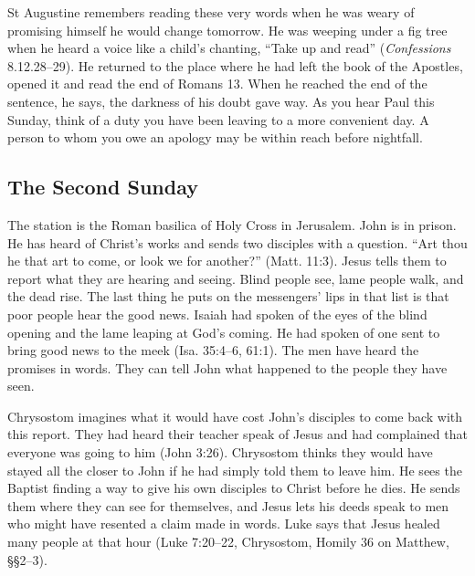 St Augustine remembers reading these very words when he was weary of
promising himself he would change tomorrow. He was weeping under a fig tree
when he heard a voice like a child's chanting, “Take up and read”
(\emph{Confessions} 8.12.28--29). He returned to the place where he had
left the book of the Apostles, opened it and read the end of Romans 13.
When he reached the end of the sentence, he says, the darkness of his doubt
gave way. As you hear Paul this Sunday, think of a duty you have been
leaving to a more convenient day. A person to whom you owe an apology may
be within reach before nightfall.

\subsection{The Second Sunday}

The station is the Roman basilica of Holy Cross in Jerusalem. John is in
prison. He has heard of Christ's works and sends two disciples with a
question. “Art thou he that art to come, or look we for another?” (Matt.
11:3). Jesus tells them to report what they are hearing and seeing. Blind
people see, lame people walk, and the dead rise. The last thing he puts on
the messengers' lips in that list is that poor people hear the good news.
Isaiah had spoken of the eyes of the blind opening and the lame leaping at
God's coming. He had spoken of one sent to bring good news to the meek
(Isa. 35:4--6, 61:1). The men have heard the promises in words. They can
tell John what happened to the people they have seen.

Chrysostom imagines what it would have cost John's disciples to come back
with this report. They had heard their teacher speak of Jesus and had
complained that everyone was going to him (John 3:26). Chrysostom thinks
they would have stayed all the closer to John if he had simply told them
to leave him. He sees the Baptist finding a way to give his own disciples
to Christ before he dies. He sends them where they can see for themselves,
and Jesus lets his deeds speak to men who might have resented a claim made
in words. Luke says that Jesus healed many people at that hour (Luke
7:20--22, Chrysostom, Homily 36 on Matthew, §§2--3).

